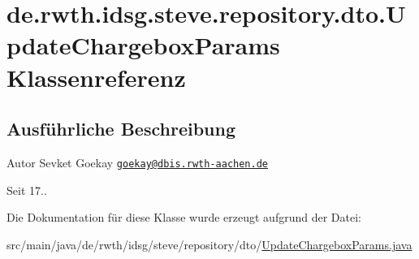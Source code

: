 \hypertarget{classde_1_1rwth_1_1idsg_1_1steve_1_1repository_1_1dto_1_1_update_chargebox_params}{\section{de.\-rwth.\-idsg.\-steve.\-repository.\-dto.\-Update\-Chargebox\-Params Klassenreferenz}
\label{classde_1_1rwth_1_1idsg_1_1steve_1_1repository_1_1dto_1_1_update_chargebox_params}
}


\subsection{Ausführliche Beschreibung}
\begin{DoxyAuthor}{Autor}
Sevket Goekay \href{mailto:goekay@dbis.rwth-aachen.de}{\tt goekay@dbis.\-rwth-\/aachen.\-de} 
\end{DoxyAuthor}
\begin{DoxySince}{Seit}
17.. 
\end{DoxySince}


Die Dokumentation für diese Klasse wurde erzeugt aufgrund der Datei\-:\begin{DoxyCompactItemize}
\item 
src/main/java/de/rwth/idsg/steve/repository/dto/\hyperlink{_update_chargebox_params_8java}{Update\-Chargebox\-Params.\-java}\end{DoxyCompactItemize}

